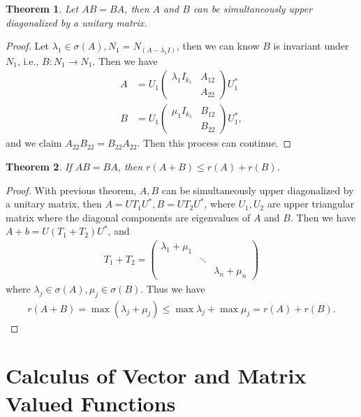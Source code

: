 \documentclass[11pt]{book}
\newtheorem{theorem}{Theorem}[section]
\theoremstyle{definition}
\numberwithin{equation}{chapter}
\begin{document}
\medskip

\begin{theorem}
Let $AB = BA$, then $A$ and $B$ can be simultaneously upper diagonalized by a unitary matrix.
\end{theorem}
\begin{proof}
Let $\lambda_1\in\sigma(A), N_1 = N_{(A - \lambda_1 I)}$, then we can know $B$ is invariant under $N_1$, i.e., $B:N_1\to N_1$. Then we have 
\begin{align*}
    A & = U_1 \begin{pmatrix}
    \lambda_1 I_{k_1} & A_{12} \\
     & A_{22}
    \end{pmatrix} U_1^* \\
    B & = U_1 \begin{pmatrix}
    \mu_1 I_{k_1} & B_{12} \\
     & B_{22}
    \end{pmatrix} U_1^*,
\end{align*}
and we claim $A_{22}B_{22} = B_{22}A_{22}$. Then this process can continue.
\end{proof}

\medskip

\begin{theorem}
If $AB = BA$, then $r(A+B)\leq r(A)+r(B)$.
\end{theorem}
\begin{proof}
With previous theorem, $A,B$ can be simultaneously upper diagonalized by a unitary matrix, then $A = UT_1U^*, B = UT_2U^*$, where $U_1, U_2$ are upper triangular matrix where the diagonal components are eigenvalues of $A$ and $B$. Then we have
$A+b = U(T_1+T_2)U^*$, and 
\begin{align*}
    T_1+T_2 = \begin{pmatrix}
    \lambda_1 + \mu_1 &  &  \\
     & \ddots &  \\
     &  & \lambda_n + \mu_n
    \end{pmatrix}
\end{align*}
where $\lambda_j\in\sigma(A), \mu_j\in\sigma(B)$. Thus we have
\begin{align*}
    r(A+B) = \max (\lambda_j + \mu_j) \leq \max \lambda_j + \max \mu_j = r(A)+r(B).
\end{align*}
\end{proof}

\medskip

\chapter{Calculus of Vector and Matrix Valued Functions}
\end{document}

